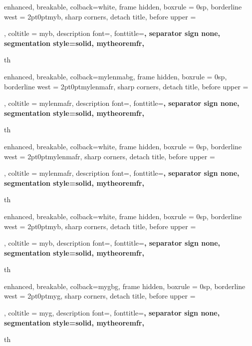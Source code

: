 {
	enhanced,
	breakable,
	colback=white,
	frame hidden,
	boxrule = 0sp,
	borderline west = {2pt}{0pt}{myb},
	sharp corners,
	detach title,
	before upper = \tcbtitle\par\smallskip,
	coltitle = myb,
	description font=\mdseries{}\selectfont,
	fonttitle=\selectfont\bfseries,
	separator sign none,
	segmentation style={solid, mytheoremfr},
}
{th}



{
	enhanced,
	breakable,
	colback=mylenmabg,
	frame hidden,
	boxrule = 0sp,
	borderline west = {2pt}{0pt}{mylenmafr},
	sharp corners,
	detach title,
	before upper = \tcbtitle\par\smallskip,
	coltitle = mylenmafr,
	description font=\mdseries{}\selectfont,
	fonttitle=\selectfont\bfseries,
	separator sign none,
	segmentation style={solid, mytheoremfr},
}
{th}


{
	enhanced,
	breakable,
	colback=white,
	frame hidden,
	boxrule = 0sp,
	borderline west = {2pt}{0pt}{mylenmafr},
	sharp corners,
	detach title,
	before upper = \tcbtitle\par\smallskip,
	coltitle = mylenmafr,
	description font=\selectfont,
	fonttitle=\selectfont\bfseries,
	separator sign none,
	segmentation style={solid, mytheoremfr},
}
{th}


{
	enhanced,
	breakable,
	colback=white,
	frame hidden,
	boxrule = 0sp,
	borderline west = {2pt}{0pt}{myb},
	sharp corners,
	detach title,
	before upper = \tcbtitle\par\smallskip,
	coltitle = myb,
	description font=\mdseries{}\selectfont,
	fonttitle=\selectfont\bfseries,
	separator sign none,
	segmentation style={solid, mytheoremfr},
}
{th}


{
	enhanced,
	breakable,
	colback=mygbg,
	frame hidden,
	boxrule = 0sp,
	borderline west = {2pt}{0pt}{myg},
	sharp corners,
	detach title,
	before upper = \tcbtitle\par\smallskip,
	coltitle = myg,
	description font=\mdseries{}\selectfont,
	fonttitle=\selectfont\bfseries,
	separator sign none,
	segmentation style={solid, mytheoremfr},
}
{th}



